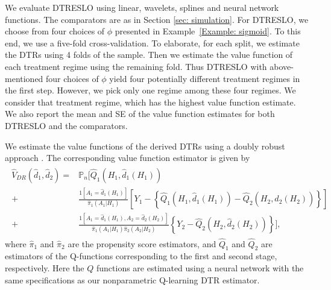 \documentclass[preprint] {imsart}
\begin{document}
We evaluate DTRESLO using linear, wavelets, splines and neural network functions. The comparators are as in Section \ref{sec: simulation}. For DTRESLO, we   choose from four choices of $\phi$  presented in Example~\ref{Example: sigmoid}.  To this end, we use a five-fold cross-validation. 
To elaborate, for each split, 
 we estimate the DTRs using 4 folds of the sample. Then we estimate the value function of each treatment regime using the remaining fold.
Thus  DTRESLO with above-mentioned four choices of $\phi$ yield four potentially different treatment regimes in the first step. However, we pick only one regime among these four regimes. We consider that treatment regime, which has the highest value function estimate. 
 We also report the mean and SE of the value function estimates for both DTRESLO and the comparators.

We estimate the value functions of the derived DTRs using a doubly robust approach \citep{Jiang2016,WDR,sonabendw2021semisupervised}. The corresponding value function estimator is given by
\begin{align*}
\begin{split}
\widehat V_{DR}(\widehat d_1,\widehat d_2)=&
\mathbb P_n\bigg[
\widehat Q_1(H_1,\hat d_1(H_1))\\
+&\frac{1[A_1=\hat d_1(H_1)]}{\widehat\pi_1(A_1|H_1)}
\left[
Y_1-\left\{\widehat  Q_1(H_1,\hat d_1(H_1))- \widehat  Q_2(H_2,\hat d_2(H_2))
\right\}\right]\\
+&\frac{1[A_1=\hat d_1(H_1),A_2=\hat d_2(H_2)]}{\widehat\pi_1(A_1|H_1)\widehat\pi_2(A_2|H_2)}\left\{
Y_2-\widehat  Q_2(H_2,\hat d_2(H_2))
\right\}\bigg],
\end{split}
\end{align*}
{ where $\widehat \pi_1$ and $\widehat \pi_2$ are the propensity score estimators, and  $\widehat Q_1$ and $\widehat Q_2$ are  estimators of the Q-functions corresponding to the first and second stage, respectively. Here the $Q$ functions are estimated using a neural network  with the same specifications as our nonparametric Q-learning DTR estimator.}  


{
} 
\end{document}

